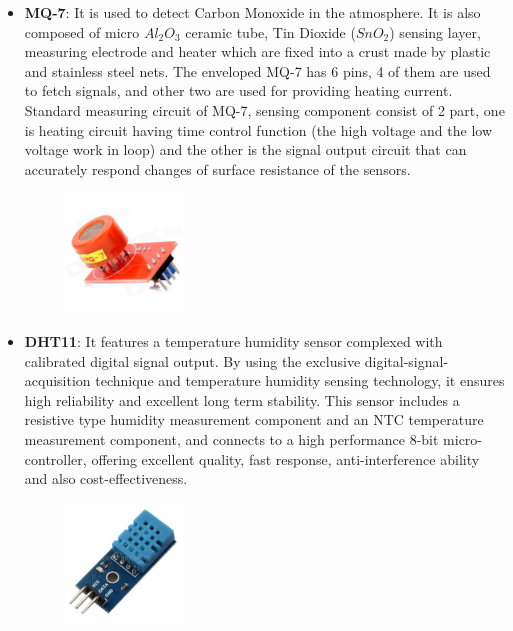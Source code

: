 \begin{enumerate}
\begin{itemize}
		\item \textbf{MQ-7}: It is used to detect Carbon Monoxide in the atmosphere. It is also composed of micro $Al_2O_3$ ceramic tube, Tin Dioxide ($SnO_2$) sensing layer, measuring electrode and heater which are fixed into a crust made by plastic and stainless steel nets. The enveloped MQ-7 has 6 pins, 4 of them are used to fetch signals, and other two are used for providing heating current. Standard measuring circuit of MQ-7, sensing component consist of 2 part, one is heating circuit having time control function (the high voltage and the low voltage work in loop) and the other is the signal output circuit that can accurately respond changes of surface resistance of the sensors.
				\\
				\begin{figure}[h]
				\centering
				\includegraphics[width=0.3\textwidth]{./mq}\\[0.1in]
				\label{MQ7}
				\end{figure}
		\item \textbf{DHT11}: It features a temperature humidity sensor complexed with calibrated digital signal output. By using the exclusive digital-signal-acquisition technique and temperature humidity sensing technology, it ensures high reliability and excellent long term stability. This sensor includes a resistive type humidity measurement component and an NTC temperature measurement component, and connects to a high performance 8-bit micro-controller, offering excellent quality, fast response, anti-interference ability and also cost-effectiveness.
		\begin{figure}[h]
		\centering
		\includegraphics[width=0.3\textwidth]{./DHT11}\\[0.1in]
		\label{DHT11}
		\end{figure}
	\end{itemize}
	

\end{enumerate}
